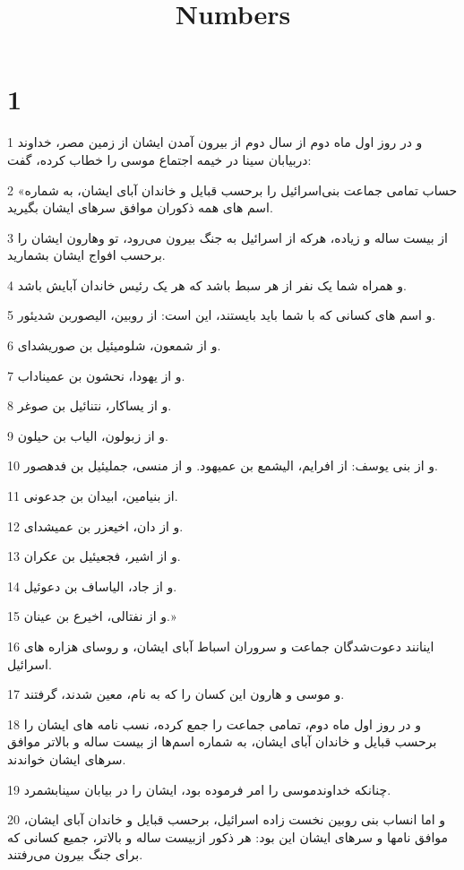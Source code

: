 

\title{Numbers}

 
\chapter{1}

\par 1 و در روز اول ماه دوم از سال دوم از بیرون آمدن ایشان از زمین مصر، خداوند دربیابان سینا در خیمه اجتماع موسی را خطاب کرده، گفت:
\par 2 «حساب تمامی جماعت بنی‌اسرائیل را برحسب قبایل و خاندان آبای ایشان، به شماره اسم های همه ذکوران موافق سرهای ایشان بگیرید.
\par 3 از بیست ساله و زیاده، هر‌که از اسرائیل به جنگ بیرون می‌رود، تو وهارون ایشان را برحسب افواج ایشان بشمارید.
\par 4 و همراه شما یک نفر از هر سبط باشد که هر یک رئیس خاندان آبایش باشد.
\par 5 و اسم های کسانی که با شما باید بایستند، این است: از روبین، الیصوربن شدیئور.
\par 6 و از شمعون، شلومیئیل بن صوریشدای.
\par 7 و از یهودا، نحشون بن عمیناداب.
\par 8 و از یساکار، نتنائیل بن صوغر.
\par 9 و از زبولون، الیاب بن حیلون.
\par 10 و از بنی یوسف: از افرایم، الیشمع بن عمیهود. و از منسی، جملیئیل بن فدهصور.
\par 11 از بنیامین، ابیدان بن جدعونی.
\par 12 و از دان، اخیعزر بن عمیشدای.
\par 13 و از اشیر، فجعیئیل بن عکران.
\par 14 و از جاد، الیاساف بن دعوئیل.
\par 15 و از نفتالی، اخیرع بن عینان.»
\par 16 اینانند دعوت‌شدگان جماعت و سروران اسباط آبای ایشان، و روسای هزاره های اسرائیل.
\par 17 و موسی و هارون این کسان را که به نام، معین شدند، گرفتند.
\par 18 و در روز اول ماه دوم، تمامی جماعت را جمع کرده، نسب نامه های ایشان را برحسب قبایل و خاندان آبای ایشان، به شماره اسم‌ها از بیست ساله و بالاتر موافق سرهای ایشان خواندند.
\par 19 چنانکه خداوندموسی را امر فرموده بود، ایشان را در بیابان سینابشمرد.
\par 20 و اما انساب بنی روبین نخست زاده اسرائیل، برحسب قبایل و خاندان آبای ایشان، موافق نامها و سرهای ایشان این بود: هر ذکور ازبیست ساله و بالاتر، جمیع کسانی که برای جنگ بیرون می‌رفتند.
